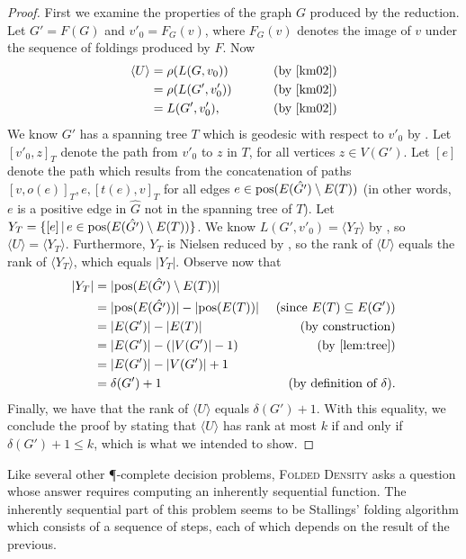 \documentclass{article}
\newcommand{\FD}{\textsc{Folded Density}}
\newcommand{\gen}[1]{\langle #1 \rangle}
\newcommand{\pos}{\textnormal{pos}}
\begin{document}
\begin{proof}
  First we examine the properties of the graph $G$ produced by the reduction.
  Let $G' = F(G)$ and $v'_0 = F_G(v)$, where $F_G(v)$ denotes the image of $v$ under the sequence of foldings produced by $F$.
  Now
  \begin{align*}
    \gen{U} & = \rho(L(G, v_0)) & \qquad \text{ (by \cite[Proposition~3.8]{km02})} \\
            & = \rho(L(G', v'_0)) & \qquad \text{ (by \cite[Lemma~3.4]{km02})} \\
            & = L(G', v'_0), & \qquad \text{ (by \cite[Lemma~2.9]{km02})}
  \end{align*}
  We know $G'$ has a spanning tree $T$ which is geodesic with respect to $v'_0$ by \cite[Lemma~6.6]{km02}.
  Let $[v'_0, z]_T$ denote the path from $v'_0$ to $z$ in $T$, for all vertices $z \in V(G')$.
  Let $[e]$ denote the path which results from the concatenation of paths $[v, o(e)]_T, e, [t(e), v]_T$ for all edges $e \in \pos(E(\hat{G'}) \setminus E(T))$ (in other words, $e$ is a positive edge in $\hat{G}$ not in the spanning tree of $T$).
  Let $Y_T = \{[e] \, | \, e \in \pos(E(\hat{G'}) \setminus E(T)) \}$.
  We know $L(G', v'_0) = \gen{Y_T}$ by \cite[Lemma~6.1]{km02}, so $\gen{U} = \gen{Y_T}$.
  Furthermore, $Y_T$ is Nielsen reduced by \cite[Proposition~6.7]{km02}, so the rank of $\gen{U}$ equals the rank of $\gen{Y_T}$, which equals $|Y_T|$.
  Observe now that
  \begin{align*}
    |Y_T| & = |\pos(E(\hat{G'}) \setminus E(T))| & \\
          & = |\pos(E(\hat{G'}))| - |\pos(E(T))| & \text{ (since } E(T) \subseteq E(G') \text{)} \\
          & = |E(G')| - |E(T)| & \text{ (by construction)} \\
          & = |E(G')| - (|V(G')| - 1) & \text{ (by \autoref{lem:tree})} \\
          & = |E(G')| - |V(G')| + 1 & \\
          & = \delta(G') + 1 & \text{ (by definition of } \delta \text{)}.
  \end{align*}
  Finally, we have that the rank of $\gen{U}$ equals $\delta(G') + 1$.
  With this equality, we conclude the proof by stating that $\gen{U}$ has rank at most $k$ if and only if $\delta(G') + 1 \leq k$, which is what we intended to show.
\end{proof}

Like several other \P-complete decision problems, \FD{} asks a question whose answer requires computing an inherently sequential function.
The inherently sequential part of this problem seems to be Stallings' folding algorithm which consists of a sequence of steps, each of which depends on the result of the previous.
\end{document}
